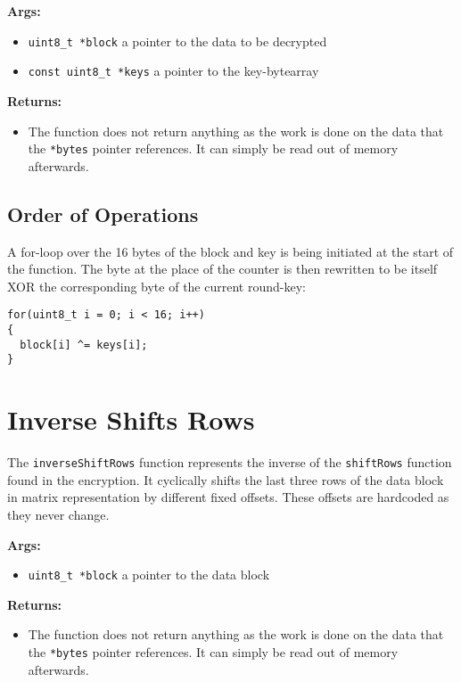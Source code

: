 \textbf{Args:}
\begin{itemize}
  \item \lstinline{uint8_t *block} a pointer to the data to be decrypted
  \item \lstinline{const uint8_t *keys} a pointer to the key-bytearray
\end{itemize}

\textbf{Returns:}
\begin{itemize}
  \item The function does not return anything as the work is done on the data that the \lstinline{*bytes} pointer references. It can simply be read out of memory afterwards.
\end{itemize}

\subsection{Order of Operations}
A for-loop over the 16 bytes of the block and key is being initiated at the start of the function. The byte at the place of the counter is then rewritten to be itself XOR the corresponding byte of the current round-key:

\begin{lstlisting}
for(uint8_t i = 0; i < 16; i++)
{
  block[i] ^= keys[i];
}
\end{lstlisting}


\section{Inverse Shifts Rows}
\label{ch:dec_inverseshiftrows}

The \lstinline{inverseShiftRows} function represents the inverse of the \lstinline{shiftRows} function found in the encryption. It cyclically shifts the last three rows of the data block in matrix representation by different fixed offsets. These offsets are hardcoded as they never change.

\textbf{Args:}
\begin{itemize}
  \item \lstinline{uint8_t *block} a pointer to the data block
\end{itemize}

\textbf{Returns:}
\begin{itemize}
  \item The function does not return anything as the work is done on the data that the \lstinline{*bytes} pointer references. It can simply be read out of memory afterwards.
\end{itemize}

